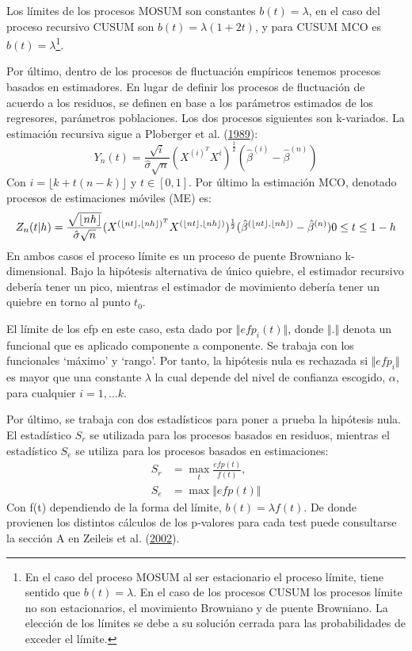 \documentclass[12pt,oneside]{reedthesis}
\begin{document}
Los límites de los procesos MOSUM son constantes \(b(t) = \lambda\), en el caso del proceso recursivo CUSUM son \(b(t) = \lambda(1 + 2t)\), y para CUSUM MCO es \(b(t) = \lambda\)\footnote{En el caso del proceso MOSUM al ser estacionario el proceso límite, tiene sentido que $b(t) = \lambda$. En el caso de los procesos CUSUM los procesos límite no son estacionarios, el movimiento Browniano y de puente Browniano. La elección de los límites se debe a su solución cerrada para las probabilidades de exceder el límite.}.

Por último, dentro de los procesos de fluctuación empíricos tenemos procesos basados en estimadores. En lugar de definir los procesos de fluctuación de acuerdo a los residuos, se definen en base a los parámetros estimados de los regresores, parámetros poblaciones. Los dos procesos siguientes son k-variados.
La estimación recursiva sigue a Ploberger et al. (\protect\hyperlink{ref-Ploberger1989}{1989}):
\begin{equation}
Y_n(t) = \frac{\sqrt i}{\hat{\sigma}\sqrt n}(X^{(i)^T} X^{i})^{\frac{1}{2}}(\hat{\beta}^{(i)} - \hat{\beta}^{(n)})
\end{equation}
Con \(i = \lfloor k + t(n-k)\rfloor\) y \(t \in [0,1]\). Por último la estimación MCO, denotado procesos de estimaciones móviles (ME) es:
\begin{equation}
Z_n(t|h) = \frac{\sqrt{\lfloor nh\rfloor} }{\hat{\sigma}\sqrt{n}}(X^{(\lfloor nt \rfloor , \lfloor nh\rfloor)^T}X^{(\lfloor nt \rfloor , \lfloor nh\rfloor)})^{\frac{1}{2}}(\hat{\beta}^{(\lfloor nt \rfloor , \lfloor nh\rfloor)}-\hat{\beta}^{(n)}) \space\space\space 0 \leq t \leq 1-h
\end{equation}
En ambos casos el proceso límite es un proceso de puente Browniano k-dimensional.
Bajo la hipótesis alternativa de único quiebre, el estimador recursivo debería tener un pico, mientras el estimador de movimiento debería tener un quiebre en torno al punto \(t_0\).

El límite de los efp en este caso, esta dado por \(\Vert efp_i(t) \Vert\), donde \(\Vert . \Vert\) denota un funcional que es aplicado componente a componente. Se trabaja con los funcionales `máximo' y `rango'. Por tanto, la hipótesis nula es rechazada si \(\Vert efp_i \Vert\) es mayor que una constante \(\lambda\) la cual depende del nivel de confianza escogido, \(\alpha\), para cualquier \(i = 1,...k\).

Por último, se trabaja con dos estadísticos para poner a prueba la hipótesis nula. El estadístico \(S_r\) se utilizada para los procesos basados en residuos, mientras el estadístico \(S_e\) se utiliza para los procesos basados en estimaciones:
\begin{align}
S_r &= \max_t\frac{efp(t)}{f(t)}, \\
S_e &= \max \Vert efp(t) \Vert
\end{align}
Con f(t) dependiendo de la forma del límite, \(b(t) = \lambda f(t)\). De donde provienen los distintos cálculos de los p-valores para cada test puede consultarse la sección A en Zeileis et al. (\protect\hyperlink{ref-Zeileis2002}{2002}).
\end{document}
